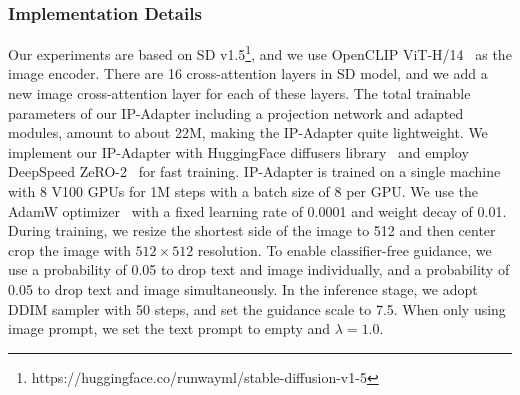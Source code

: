 \documentclass{article}
\begin{document}
\subsubsection{Implementation Details}
Our experiments are based on SD v1.5\footnote{https://huggingface.co/runwayml/stable-diffusion-v1-5}, and we use OpenCLIP ViT-H/14~\cite{ilharco2021openclip} as the image encoder. There are 16 cross-attention layers in SD model, and we add a new image cross-attention layer for each of these layers. The total trainable parameters of our IP-Adapter including a projection network and adapted modules, amount to about 22M, making the IP-Adapter quite lightweight. We implement our IP-Adapter with HuggingFace diffusers library~\cite{von-platen-etal-2022-diffusers} and employ DeepSpeed ZeRO-2~\cite{ramesh2021zero} for fast training. IP-Adapter is trained on a single machine with 8 V100 GPUs for 1M steps with a batch size of 8 per GPU. We use the AdamW optimizer~\cite{loshchilov2017decoupled} with a fixed learning rate of 0.0001 and weight decay of 0.01. During training, we resize the shortest side of the image to 512 and then center crop the image with $512\times512$ resolution. To enable classifier-free guidance, we use a probability of 0.05 to drop text and image individually, and a probability of 0.05 to drop text and image simultaneously. In the inference stage, we adopt DDIM sampler with 50 steps, and set the guidance scale to 7.5. When only using image prompt, we set the text prompt to empty and $\lambda=1.0$.
\end{document}
